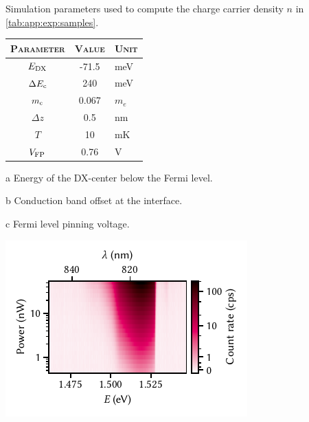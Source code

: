 \begin{margintable}
    \centering
    \footnotesize
    \begin{threeparttable}
        \caption{
            Simulation parameters used to compute the charge carrier density $n$ in \cref{tab:app:exp:samples}.
        }
        \label{tab:app:exp:samples:ps}
        \begin{tabularx}{\marginparwidth}{c S l}
            \toprule
            \textsc{Parameter}              & {\textsc{Value}}  & \textsc{Unit} \\
            \midrule
            $E_{\mathrm{DX}}$          & -71.5             & \unit{meV} \\
            $\Delta E_{\mathrm{c}}$    & 240               & \unit{meV} \\
            $m_{\mathrm{c}}$                    & 0.067             & $m_e$ \\
            $\Delta z$                      & 0.5               & \unit{nm} \\
            $T$                             & 10                & \unit{mK} \\
            $V_{\mathrm{FP}}$          & 0.76              & \unit{V} \\
            \bottomrule
        \end{tabularx}
        \begin{tablenotes}
            \scriptsize
            \item[a] Energy of the DX-center below the Fermi level.
            \item[b] Conduction band offset at the  interface.
            \item[c] Fermi level pinning voltage.
        \end{tablenotes}
    \end{threeparttable}
\end{margintable}
%

\begin{marginfigure}
    \centering
    \includegraphics{img/pdf/experiment/2deg_pl_power_dependence}
    \caption[
        \protect\newline
    ]{}
    \label{fig:app:exp:observations:2deg_pl_power_dependence}
\end{marginfigure}

